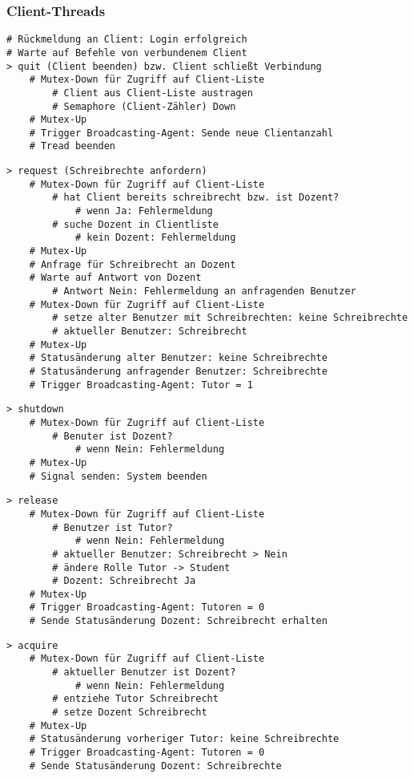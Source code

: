 \subsubsection{Client-Threads}
\begin{lstlisting}
# Rückmeldung an Client: Login erfolgreich
# Warte auf Befehle von verbundenem Client
> quit (Client beenden) bzw. Client schließt Verbindung
    # Mutex-Down für Zugriff auf Client-Liste
        # Client aus Client-Liste austragen
        # Semaphore (Client-Zähler) Down
    # Mutex-Up
    # Trigger Broadcasting-Agent: Sende neue Clientanzahl
    # Tread beenden
\end{lstlisting}
\begin{lstlisting}
> request (Schreibrechte anfordern)
    # Mutex-Down für Zugriff auf Client-Liste
        # hat Client bereits schreibrecht bzw. ist Dozent?
            # wenn Ja: Fehlermeldung
        # suche Dozent in Clientliste
            # kein Dozent: Fehlermeldung
    # Mutex-Up
    # Anfrage für Schreibrecht an Dozent
    # Warte auf Antwort von Dozent
        # Antwort Nein: Fehlermeldung an anfragenden Benutzer
    # Mutex-Down für Zugriff auf Client-Liste
        # setze alter Benutzer mit Schreibrechten: keine Schreibrechte
        # aktueller Benutzer: Schreibrecht
    # Mutex-Up
    # Statusänderung alter Benutzer: keine Schreibrechte
    # Statusänderung anfragender Benutzer: Schreibrechte    
    # Trigger Broadcasting-Agent: Tutor = 1
\end{lstlisting}
\begin{lstlisting}
> shutdown
    # Mutex-Down für Zugriff auf Client-Liste
        # Benuter ist Dozent?
            # wenn Nein: Fehlermeldung
    # Mutex-Up
    # Signal senden: System beenden
\end{lstlisting}
\begin{lstlisting}
> release
    # Mutex-Down für Zugriff auf Client-Liste
        # Benutzer ist Tutor?
            # wenn Nein: Fehlermeldung
        # aktueller Benutzer: Schreibrecht > Nein
        # ändere Rolle Tutor -> Student
        # Dozent: Schreibrecht Ja
    # Mutex-Up
    # Trigger Broadcasting-Agent: Tutoren = 0
    # Sende Statusänderung Dozent: Schreibrecht erhalten
\end{lstlisting}
\begin{lstlisting}
> acquire
    # Mutex-Down für Zugriff auf Client-Liste
        # aktueller Benutzer ist Dozent?
            # wenn Nein: Fehlermeldung
        # entziehe Tutor Schreibrecht
        # setze Dozent Schreibrecht
    # Mutex-Up
    # Statusänderung vorheriger Tutor: keine Schreibrechte
    # Trigger Broadcasting-Agent: Tutoren = 0
    # Sende Statusänderung Dozent: Schreibrechte
\end{lstlisting}
